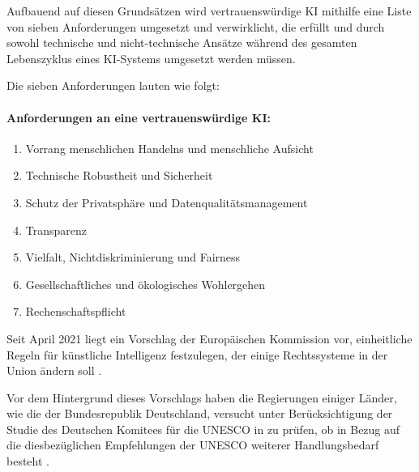 \documentclass[12pt]{report}
\begin{document}
Aufbauend auf diesen Grundsätzen wird vertrauenswürdige KI mithilfe eine Liste von sieben Anforderungen umgesetzt und verwirklicht, die erfüllt und durch sowohl technische und nicht-technische Ansätze während des gesamten Lebenszyklus eines KI-Systems umgesetzt werden müssen.

Die sieben Anforderungen lauten wie folgt:

\paragraph{Anforderungen an eine vertrauenswürdige KI:}
\begin{enumerate}
	\item  Vorrang menschlichen Handelns und menschliche Aufsicht
	\item  Technische Robustheit und Sicherheit
	\item  Schutz der Privatsphäre und Datenqualitätsmanagement
	\item  Transparenz
	\item  Vielfalt, Nichtdiskriminierung und Fairness
	\item  Gesellschaftliches und ökologisches Wohlergehen
	\item  Rechenschaftspflicht
\end{enumerate}

Seit April 2021 liegt ein Vorschlag der Europäischen Kommission vor, einheitliche Regeln für künstliche Intelligenz festzulegen, der einige Rechtssysteme in der Union ändern soll \cite{GesetzesentwurfEUComm}.

Vor dem Hintergrund dieses Vorschlags haben die Regierungen einiger Länder, wie die der Bundesrepublik Deutschland, versucht unter Berücksichtigung der Studie des Deutschen Komitees für die UNESCO in \cite[UNESCO-Empfehlung zur Ethik Künstlicher Intelligenz. Bedingungen zur Implementierung in Deutschland]{Kettemann} zu prüfen, ob in Bezug auf die diesbezüglichen Empfehlungen der UNESCO weiterer Handlungsbedarf besteht \cite{Deutscher_Bundestag}.  
\end{document}
